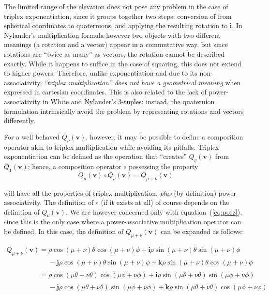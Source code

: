 \documentclass{article}
\let\vec\mathbf
\newcommand{\mathnewline}[1][\quad]{\\\phantom{#1}}
\newcommand{\mathnewlineeq}[1][\quad]{\\\phantom{#1 = }}
\begin{document}
The limited range of the elevation does not pose any problem in the
case of triplex exponentiation, since it groups together two steps:
conversion of from spherical coordinates to quaternions, and applying
the resulting rotation to $\vec{i}$.  In Nylander's multiplication
formula however two objects with two different meanings (a rotation
and a vector) appear in a commutative way, but since rotations are
``twice as many'' as vectors, the rotation cannot be described
exactly.  While it happens to suffice in the case of squaring, this
does not extend to higher powers.  Therefore, unlike exponentiation
and due to its non-associativity, \emph{``triplex multiplication''
  does not have a geometrical meaning} when expressed in cartesian
coordinates.  This is also related to the lack of power-associativity
in White and Nylander's 3-tuples; instead, the quaternion formulation
intrinsically avoid the problem by representing rotations and vectors
differently.

For a well behaved $Q_\nu(\vec{v})$, however, it may be possible to
define a composition operator akin to triplex multiplication while
avoiding its pitfalls.  Triplex exponentiation can be defined as
the operation that ``creates'' $Q_\nu(\vec{v})$ from $Q_1(\vec{v})$;
hence, a composition operator $\circ$ possessing the property
\begin{equation*}
  Q_\mu(\vec{v}) \circ Q_\nu(\vec{v}) = Q_{\mu+\nu}(\vec{v})
\end{equation*}

\noindent
will have all the properties of triplex multiplication, \emph{plus}
(by definition) power-associativity.  The definition of $\circ$ (if it
exists at all) of course depends on the definition of
$Q_\nu(\vec{v})$.  We are however concerned only with
equation~(\ref{eq:posz}), since this is the only case where a
power-associative multiplication operator can be defined.  In this
case, the definition of $Q_{\mu+\nu}(\vec{v})$ can be expanded as
follows:

\begin{equation*}
  \begin{array}{l}
  Q_{\mu+\nu}(\vec{v}) = \rho \cos (\mu+\nu)\theta \cos (\mu+\nu)\phi + \vec{i} \rho \sin (\mu+\nu)\theta \sin (\mu+\nu)\phi
  \mathnewlineeq[Q_{\mu+\nu}(\vec{v})] - \vec{j} \rho \cos (\mu+\nu)\theta \sin (\mu+\nu)\phi + \vec{k} \rho \sin (\mu+\nu)\theta \cos (\mu+\nu)\phi
  \mathnewline[Q_{\mu+\nu}(\vec{v})] = \rho \cos (\mu\theta+\nu\theta) \cos (\mu\phi+\nu\phi) + \vec{i} \rho \sin (\mu\theta+\nu\theta) \sin (\mu\phi+\nu\phi)
  \mathnewlineeq[Q_{\mu+\nu}(\vec{v})] - \vec{j} \rho \cos (\mu\theta+\nu\theta) \sin (\mu\phi+\nu\phi) + \vec{k} \rho \sin (\mu\theta+\nu\theta) \cos (\mu\phi+\nu\phi)
  \end{array}
\end{equation*}
\end{document}
